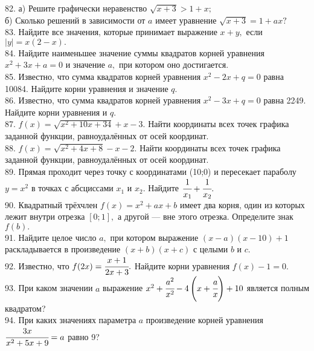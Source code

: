 82. а) Решите графически неравенство $\sqrt{x+3}>1+x;$\\
б) Сколько решений в зависимости от  $a$ имеет уравнение $\sqrt{x+3}=1+ax?$\\
83. Найдите все значения, которые принимает выражение $x+y,$ если $|y|=x(2-x).$\\
84. Найдите наименьшее значение суммы квадратов корней уравнения $x^2+3x+a=0$ и значение $a,$ при котором оно достигается.\\
85. Известно, что сумма квадратов корней уравнения $x^2-2x + q = 0$ равна 10084.
Найдите корни уравнения и значение $q.$\\
86. Известно, что сумма квадратов корней уравнения $x^2 -3x + q = 0$ равна 2249.
Найдите корни уравнения и $q.$\\
87. $f(x)=\sqrt{x^2+10x+34}+x-3.$ Найти координаты всех точек графика заданной функции,
равноудалённых от осей координат.\\
88. $f(x)=\sqrt{x^2+4x+8}-x-2.$ Найти координаты всех точек графика заданной функции,
равноудалённых от осей координат.\\
89. Прямая проходит через точку с координатами (10;0) и пересекает параболу $y=x^2$ в точках с абсциссами $x_1$ и $x_2.$ Найдите $\cfrac{1}{x_1}+\cfrac{1}{x_2}.$\\
90. Квадратный трёхчлен $f(x)=x^2+ax+b$ имеет два корня, один из которых лежит внутри отрезка  $[0;1],$ а
другой --- вне этого отрезка. Определите знак $f(b).$\\
91. Найдите целое число  $a,$ при котором выражение  $(x-a)(x-10)+1$ раскладывается в произведение $(x+b)(x+c)$ с целыми  $b$ и  $c.$\\
92. Известно, что $f(2x)=\cfrac{x+1}{2x+3}.$ Найдите корни уравнения $f(x)-1=0.$\\
93. При каком значении $a$ выражение $x^2+\cfrac{a^2}{x^2}-4\left(x+\cfrac{a}{x}\right)+10$ является полным квадратом?\\
94. При каких значениях параметра $a$ произведение корней уравнения $\cfrac{3x}{x^2+5x+9}=a$ равно 9?
\newpage
